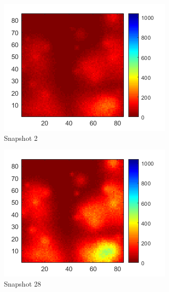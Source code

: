 \documentclass[letterpaper,12pt,peerreviewca,draftcls]{IEEEtran}
\begin{document}
\begin{figure}[h]
	\centering
	
	\begin{subfigure}[t]{0.23\textwidth}
		\includegraphics[width=\linewidth]{"Figure 15a"}
		\caption{Snapshot 2}
	\end{subfigure}
	\begin{subfigure}[t]{0.23\textwidth}
		\includegraphics[width=\linewidth]{"Figure 15b"}
		\caption{Snapshot 28}
	\end{subfigure}
	\begin{subfigure}[t]{0.23\textwidth}

\end{subfigure}
\end{figure}
\end{document}
